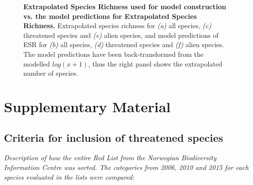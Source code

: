 \documentclass{article}
\begin{document}
\begin{figure}
        \hfill
    \caption{\textbf{Extrapolated Species Richness used for model construction vs. the model predictions for Extrapolated Species Richness.} Extrapolated species richness for \textit{(a)} all species, \textit{(c)} threatened species and \textit{(e)} alien species, and model predictions of ESR for \textit{(b)} all species, \textit{(d)} threatened species and \textit{(f)} alien species. 
    The model predictions have been back-transformed from the modelled $log(x+1)$, thus the right panel shows the extrapolated number of species.}
    \label{fig:ESR_predictions}
\end{figure}

\clearpage
\section{Supplementary Material} \FloatBarrier   %
\renewcommand\thefigure{S.\arabic{figure}}
\setcounter{figure}{0}
\renewcommand\thetable{S.\arabic{table}}
\setcounter{table}{0}

\subsection{Criteria for inclusion of threatened species} \label{sec:Redlist_criteria}
\textit{Description of how the entire Red List from the Norwegian Biodiversity Information Centre was sorted. The categories from 2006, 2010 and 2015 for each species evaluated in the lists were compared:}\\
\end{document}
